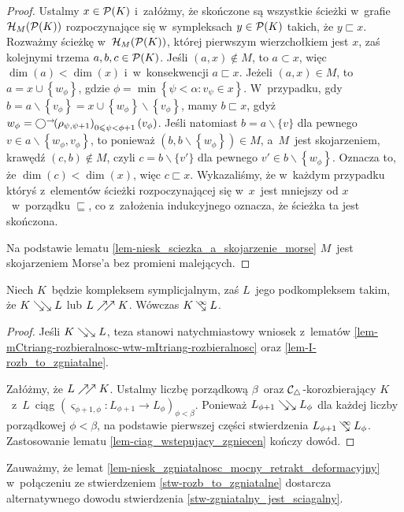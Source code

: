\begin{proof}
Ustalmy $x\in \mathcal{P}(K)$ i~załóżmy, że skończone są wszystkie ścieżki w~grafie $\mathcal{H}_M(\mathcal{P}(K))$ rozpoczynające się w~sympleksach $y\in \mathcal{P}(K)$ takich, że $y\sqsubset x$. Rozważmy ścieżkę w~$\mathcal{H}_M(\mathcal{P}(K))$, której pierwszym wierzchołkiem jest $x$, zaś kolejnymi trzema $a,b,c\in\mathcal{P}(K)$. Jeśli $(a,x)\not\in M$, to $a\subset x$, więc \mbox{$\dim(a)<\dim(x)$} i~w~konsekwencji $a\sqsubset x$. Jeżeli $(a,x)\in M$, to $a=x\cup\left\{w_\phi\right\}$, gdzie $\phi=\min\left\{\psi<\alpha:v_\psi\in x\right\}$. W~przypadku, gdy $b=a\smallsetminus\left\{v_\phi\right\}=x\cup\left\{w_\phi\right\}\smallsetminus\left\{v_\phi\right\}$, mamy $b\sqsubset x$, gdyż $w_\phi=\bigcirc^\rightarrow\!\!\left(\rho_{\psi,\psi+1}\right)_{0\leqslant\psi<\phi+1}\left(v_\phi\right)$. Jeśli natomiast $b=a\smallsetminus\{v\}$ dla pewnego $v\in a\smallsetminus\left\{w_\phi, v_\phi\right\}$, to ponieważ $\left(b,b\smallsetminus\left\{w_\phi\right\}\right)\in M$, a~$M$~jest skojarzeniem, krawędź $(c,b)\not\in M$, czyli $c=b\smallsetminus \{v'\}$ dla pewnego $v'\in b\smallsetminus\left\{w_\phi\right\}$. Oznacza to, że $\dim(c)<\dim(x)$, więc $c\sqsubset x$. Wykazaliśmy, że w~każdym przypadku któryś z~elementów ścieżki rozpoczynającej się w~$x$~jest mniejszy od $x$~w~porządku $\sqsubseteq$, co z~założenia indukcyjnego oznacza, że ścieżka ta jest skończona.

Na podstawie lematu \ref{lem-niesk_sciezka_a_skojarzenie_morse} $M$~jest skojarzeniem Morse'a bez promieni malejących.
\end{proof}

\begin{stw}\label{stw-rozb_to_zgniatalne}
Niech $K$~będzie kompleksem symplicjalnym,
zaś $L$~jego podkompleksem takim, że $K\searrow\!\!\searrow L$ lub $L\nearrow\!\!\nearrow K$. Wówczas $K\infcoll L$.
\end{stw}
\begin{proof}
Jeśli $K\searrow\!\!\searrow L$, teza stanowi natychmiastowy wniosek z~lematów \ref{lem-mCtriang-rozbieralnosc-wtw-mItriang-rozbieralnosc} oraz \ref{lem-I-rozb_to_zgniatalne}.

Załóżmy, że $L\nearrow\!\!\nearrow K$. Ustalmy liczbę porządkową $\beta$~oraz \mbox{$\mathcal{C}_\triangle$-korozbierający} $K$~z~$L$~ciąg $\left(\varsigma_{\phi+1,\phi}\colon L_{\phi+1}\to L_\phi
\right)_{\phi<\beta}$. Ponieważ $L_{\phi+1}\searrow\!\!\searrow L_{\phi}$ dla każdej liczby porządkowej $\phi<\beta$, na podstawie pierwszej części stwierdzenia $L_{\phi+1}\infcoll L_\phi$. Zastosowanie lematu \ref{lem-ciag_wstepujacy_zgniecen} kończy dowód.
\end{proof}

Zauważmy, że lemat \ref{lem-niesk_zgniatalnosc_mocny_retrakt_deformacyjny} w~połączeniu ze stwierdzeniem \ref{stw-rozb_to_zgniatalne} dostarcza alternatywnego dowodu stwierdzenia \ref{stw-zgniatalny_jest_sciagalny}.

